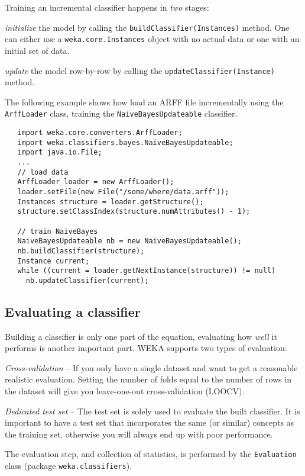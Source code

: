 Training an incremental classifier happens in \textit{two} stages:
\begin{tight_enumerate}
	\item \textit{initialize} the model by calling the
\texttt{buildClassifier(Instances)} method. One can either use a
\texttt{weka.core.Instances} object with no actual data or one with an initial
set of data.
	\item \textit{update} the model row-by-row by calling the
\texttt{updateClassifier(Instance)} method.
\end{tight_enumerate}
The following example shows how load an ARFF file incrementally using the
\texttt{ArffLoader} class, training the
\texttt{NaiveBayesUpdateable} classifier.
\begin{verbatim}
   import weka.core.converters.ArffLoader;
   import weka.classifiers.bayes.NaiveBayesUpdateable;
   import java.io.File;
   ...
   // load data
   ArffLoader loader = new ArffLoader();
   loader.setFile(new File("/some/where/data.arff"));
   Instances structure = loader.getStructure();
   structure.setClassIndex(structure.numAttributes() - 1);

   // train NaiveBayes
   NaiveBayesUpdateable nb = new NaiveBayesUpdateable();
   nb.buildClassifier(structure);
   Instance current;
   while ((current = loader.getNextInstance(structure)) != null)
     nb.updateClassifier(current);
\end{verbatim}

\newpage

\subsection{Evaluating a classifier}
Building a classifier is only one part of the equation, evaluating how
\textit{well} it performs is another important part. WEKA supports two types of
evaluation:
\begin{tight_itemize}
	\item \textit{Cross-validation} -- If you only have a single dataset and
want to get a reasonable realistic evaluation. Setting the number of folds equal
to the number of rows in the dataset will give you leave-one-out
cross-validation (LOOCV).
	\item \textit{Dedicated test set} -- The test set is solely used to evaluate
the built classifier. It is important to have a test set that incorporates the
same (or similar) concepts as the training set, otherwise you will always end
up with poor performance.
\end{tight_itemize}
The evaluation step, and collection of statistics, is performed by the
\texttt{Evaluation} class (package \texttt{weka.classifiers}).

